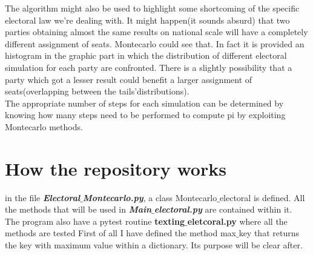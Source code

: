 \documentclass[12pt,a4paper,openright]{report}
\begin{document}
The algorithm might also be used to highlight some shortcoming of the specific electoral law we're dealing with. It might happen(it sounds absurd) that two parties obtaining almost the same results on national scale will have a completely different assignment of seats. Montecarlo could see that. In fact it is provided an histogram in the graphic part in which the distribution of different electoral simulation for each party are confronted. There is a slightly possibility that a party which got a lesser result could benefit a larger assignment of seats(overlapping between the tails'distributions).\\
The appropriate number of steps for each simulation can be determined by knowing how many steps need to be performed to compute pi by exploiting Montecarlo methods.\\
\section*{How the repository works}
in the file \textit{\textbf{Electoral$\_$Montecarlo.py}}, a class Montecarlo$\_$electoral is defined. All the methods that will be used in \textit{\textbf{Main$\_$electoral.py}} are contained within it.\\ The program also have a pytest routine \textbf{texting$\_$eletcoral.py} where all the methods are tested
First of all I have defined the method max$\_$key that returns the key with maximum value within a dictionary. Its purpose will be clear after.
\end{document}
